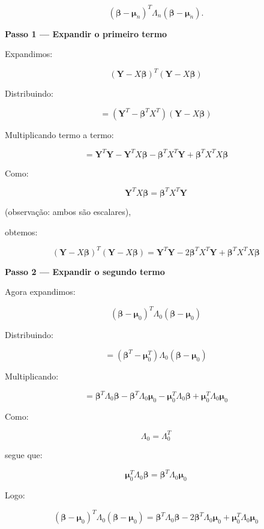 \documentclass[12pt, a4paper]{article}
\begin{document}
\[
(\boldsymbol\beta-\boldsymbol\mu_n)^T
\Lambda_n
(\boldsymbol\beta-\boldsymbol\mu_n).
\]

\vspace{0.3cm}

\textbf{Passo 1 — Expandir o primeiro termo}

Expandimos:

\[
(\mathbf Y-X\boldsymbol\beta)^T
(\mathbf Y-X\boldsymbol\beta)
\]

Distribuindo:

\[
=
(\mathbf Y^T-\boldsymbol\beta^TX^T)
(\mathbf Y-X\boldsymbol\beta)
\]

Multiplicando termo a termo:

\[
=
\mathbf Y^T\mathbf Y
-
\mathbf Y^TX\boldsymbol\beta
-
\boldsymbol\beta^TX^T\mathbf Y
+
\boldsymbol\beta^TX^TX\boldsymbol\beta
\]

Como:

\[
\mathbf Y^TX\boldsymbol\beta
=
\boldsymbol\beta^TX^T\mathbf Y
\]

(observação: ambos são escalares),

obtemos:

\[
(\mathbf Y-X\boldsymbol\beta)^T
(\mathbf Y-X\boldsymbol\beta)
=
\mathbf Y^T\mathbf Y
-
2\boldsymbol\beta^TX^T\mathbf Y
+
\boldsymbol\beta^TX^TX\boldsymbol\beta
\]

\vspace{0.4cm}

\textbf{Passo 2 — Expandir o segundo termo}

Agora expandimos:

\[
(\boldsymbol\beta-\boldsymbol\mu_0)^T
\Lambda_0
(\boldsymbol\beta-\boldsymbol\mu_0)
\]

Distribuindo:

\[
=
(\boldsymbol\beta^T-\boldsymbol\mu_0^T)
\Lambda_0
(\boldsymbol\beta-\boldsymbol\mu_0)
\]

Multiplicando:

\[
=
\boldsymbol\beta^T\Lambda_0\boldsymbol\beta
-
\boldsymbol\beta^T\Lambda_0\boldsymbol\mu_0
-
\boldsymbol\mu_0^T\Lambda_0\boldsymbol\beta
+
\boldsymbol\mu_0^T\Lambda_0\boldsymbol\mu_0
\]

Como:

\[
\Lambda_0=\Lambda_0^T
\]

segue que:

\[
\boldsymbol\mu_0^T\Lambda_0\boldsymbol\beta
=
\boldsymbol\beta^T\Lambda_0\boldsymbol\mu_0
\]

Logo:

\[
(\boldsymbol\beta-\boldsymbol\mu_0)^T
\Lambda_0
(\boldsymbol\beta-\boldsymbol\mu_0)
=
\boldsymbol\beta^T\Lambda_0\boldsymbol\beta
-
2\boldsymbol\beta^T\Lambda_0\boldsymbol\mu_0
+
\boldsymbol\mu_0^T\Lambda_0\boldsymbol\mu_0
\]
\end{document}
